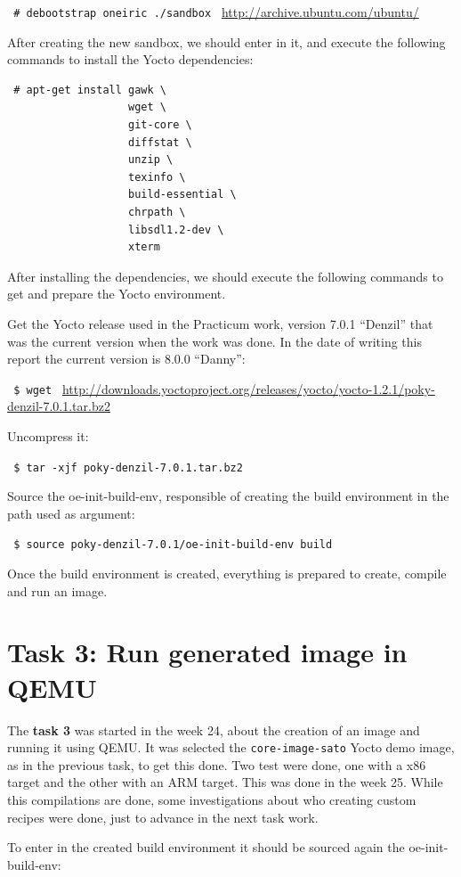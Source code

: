 \documentclass[a4paper,11pt,openany]{report}
\begin{document}
\verb$ # debootstrap oneiric ./sandbox $ \url{http://archive.ubuntu.com/ubuntu/}

After creating the new sandbox, we should enter in it, and execute the following commands to install the Yocto dependencies:
\begin{verbatim}
 # apt-get install gawk \
                   wget \
                   git-core \
                   diffstat \
                   unzip \
                   texinfo \
                   build-essential \
                   chrpath \
                   libsdl1.2-dev \
                   xterm
\end{verbatim}

After installing the dependencies, we should execute the following commands to get and prepare the Yocto environment.

Get the Yocto release used in the Practicum work, version 7.0.1 ``Denzil'' that was the current version when the work was done. In the date of writing this report the current version is 8.0.0 ``Danny'':

\verb# $ wget # \url{http://downloads.yoctoproject.org/releases/yocto/yocto-1.2.1/poky-denzil-7.0.1.tar.bz2}

Uncompress it:

\verb# $ tar -xjf poky-denzil-7.0.1.tar.bz2 #

Source the oe-init-build-env, responsible of creating the build environment in the path used as argument:

\verb# $ source poky-denzil-7.0.1/oe-init-build-env build #

Once the build environment is created, everything is prepared to create, compile and run an image.

\section{Task 3: Run generated image in QEMU}
The \textbf{task 3} was started in the week 24, about the creation of an image and running it using QEMU. It was selected the \verb#core-image-sato# Yocto demo image, as in the previous task, to get this done. Two test were done, one with a x86 target and the other with an ARM target. This was done in the week 25. While this compilations are done, some investigations about who creating custom recipes were done, just to advance in the next task work.

To enter in the created build environment it should be sourced again the oe-init-build-env:
\end{document}
